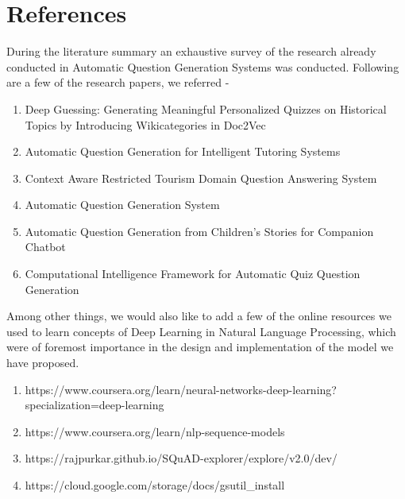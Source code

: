 \chapter{References}

During the literature summary an exhaustive survey of the research already
conducted in Automatic Question Generation Systems was conducted. Following are
a few of the research papers, we referred - 

\begin{enumerate}

\item Deep Guessing: Generating Meaningful Personalized Quizzes on Historical
Topics by Introducing Wikicategories in Doc2Vec

\item Automatic Question Generation for Intelligent Tutoring Systems

\item Context Aware Restricted Tourism Domain Question Answering System

\item Automatic Question Generation System

\item Automatic Question Generation from Children’s Stories for Companion
Chatbot

\item Computational Intelligence Framework for Automatic Quiz Question
Generation

\end{enumerate}

Among other things, we would also like to add a few of the online resources we
used to learn concepts of Deep Learning in Natural Language Processing, which
were of foremost importance in the design and implementation of the model we
have proposed. 

\begin{enumerate}

\item
https://www.coursera.org/learn/neural-networks-deep-learning?specialization=deep-learning

\item https://www.coursera.org/learn/nlp-sequence-models

\item https://rajpurkar.github.io/SQuAD-explorer/explore/v2.0/dev/

\item https://cloud.google.com/storage/docs/gsutil\_install

\end{enumerate}

